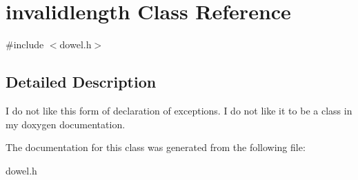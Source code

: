 \hypertarget{classinvalidlength}{\section{invalidlength Class Reference}
\label{classinvalidlength}
}


{\ttfamily \#include $<$dowel.\-h$>$}



\subsection{Detailed Description}
I do not like this form of declaration of exceptions. I do not like it to be a class in my doxygen documentation. 

The documentation for this class was generated from the following file\-:\begin{DoxyCompactItemize}
\item 
dowel.\-h\end{DoxyCompactItemize}
